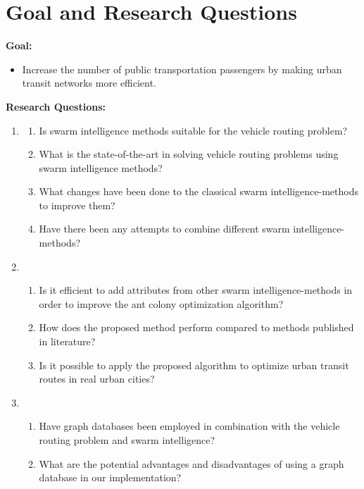 \section{Goal and Research Questions}
\textbf{Goal:}
\begin{itemize}
\item \label{itm:goal} Increase the number of public transportation passengers by making urban transit networks more efficient.
\end{itemize}
\textbf{Research Questions:}
\begin{enumerate}[label=\textbf{\arabic*})]
\item \label{itm:1}
    \begin{enumerate}
    \item \label{itm:1a} Is swarm intelligence methods suitable for the vehicle routing problem?
    \item \label{itm:1b} What is the state-of-the-art in solving vehicle routing problems using swarm intelligence methods?
    \item \label{itm:1c} What changes have been done to the classical swarm intelligence-methods to improve them?
    \item \label{itm:1d} Have there been any attempts to combine different swarm intelligence-methods?
	\end{enumerate}
\item
    \begin{enumerate}
    \item \label{itm:2a} Is it efficient to add attributes from other swarm intelligence-methods in order to improve the ant colony optimization algorithm?
    \item \label{itm:2b1} How does the proposed method perform compared to methods published in literature?
    \item \label{itm:2c} Is it possible to apply the proposed algorithm to optimize urban transit routes in real urban cities?
    \end{enumerate}
\item
	\begin{enumerate}
    \item \label{itm:3a} Have graph databases been employed in combination with the vehicle routing problem and swarm intelligence?
	\item \label{itm:3b} What are the potential advantages and disadvantages of using a graph database in our implementation?
    \end{enumerate}
\end{enumerate}